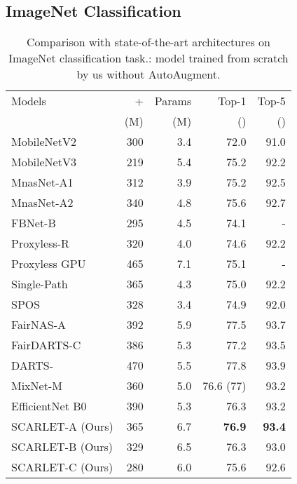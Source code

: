 \documentclass[10pt,twocolumn,letterpaper]{article}
\theoremstyle{definition}
\begin{document}
\subsection{ImageNet Classification} 


\setlength{\tabcolsep}{4pt}
\begin{table}
\centering
\begin{tabular}{|l|r|r|r|r|}  
\hline
Models  & +  & Params  & Top-1 & Top-5 \\
&(M)&(M)&()&()
\\
\hline
MobileNetV2 \cite{sandler2018mobilenetv2}       & 300  & 3.4 & 72.0 & 91.0     \\
MobileNetV3 \cite{howard2019searching} & 219 & 5.4  &75.2 & 92.2   \\
MnasNet-A1 \cite{tan2018mnasnet} & 312 & 3.9 & 75.2 & 92.5   \\
MnasNet-A2 \cite{tan2018mnasnet}  & 340 & 4.8 & 75.6 & 92.7 \\
FBNet-B \cite{wu2018fbnet} & 295 & 4.5 & 74.1 & -\\ 
Proxyless-R \cite{cai2018proxylessnas}   & 320 & 4.0 & 74.6 & 92.2 \\
Proxyless GPU \cite{cai2018proxylessnas}  & 465 & 7.1  & 75.1 & -\\
Single-Path \cite{stamoulis2019single} & 365 & 4.3 & 75.0 & 92.2 \\ 
SPOS \cite{guo2019single}  & 328 & 3.4 &74.9 & 92.0 \\
FairNAS-A \cite{chu2019fairnas} & 392& 5.9& 77.5 & 93.7 \\
FairDARTS-C \cite{chu2019fair}& 386 & 5.3 & 77.2 & 93.5 \\
DARTS- \cite{chu2020darts} & 470  & 5.5 &  77.8& 93.9   \\
MixNet-M \cite{tan2020mixconv} & 360 & 5.0 & 76.6 (77) & 93.2 \\
EfficientNet B0 \cite{tan2019efficientnet}  & 390 & 5.3 &  76.3 & 93.2 \\
SCARLET-A (Ours) & 365 & 6.7 & \textbf{76.9} & \textbf{93.4}  \\
SCARLET-B (Ours) & 329 & 6.5 &76.3 & 93.0  \\
SCARLET-C (Ours) & 280 & 6.0 & 75.6 & 92.6  \\
\hline
\end{tabular}
\smallskip
\caption{Comparison with state-of-the-art architectures on ImageNet classification task.: model trained from scratch by us without AutoAugment.}
\label{tab:comparison-imagenet}
\end{table}
\end{document}
